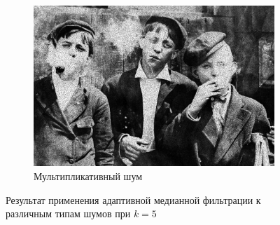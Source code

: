 \begin{figure}[ht!]
\begin{subfigure}[b]{0.5\linewidth}
      \includegraphics[width=0.95\linewidth]{../Adaptive_Median_Filter/Adaptive_Median_Speckle_noise_k=5.jpg} 
      \caption{Мультипликативный шум} 
  \end{subfigure} 
  \caption{Результат применения адаптивной медианной фильтрации к различным типам шумов при $k = 5$}
\end{figure}

